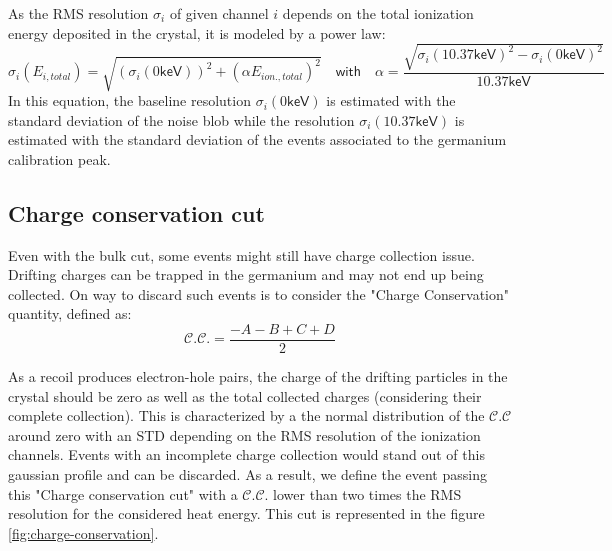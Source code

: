As the RMS resolution $\sigma_i$ of given channel $i$ depends on the total ionization energy deposited in the crystal, it is modeled by a power law:
\begin{equation}
\sigma_i\left( E_{i, total} \right)
=
\sqrt{ 
\left( \sigma_i(0\textsf{keV}) \right)^2 + 
\left( \alpha E_{ion., total} \right)^2
}
\quad \textsf{with} \quad
\alpha = \frac{\sqrt{\sigma_i(10.37\textsf{keV})^2 - \sigma_i(0\textsf{keV})^2}}{10.37 \textsf{keV}}
\end{equation}
In this equation, the baseline resolution $\sigma_i(0\textsf{keV})$ is estimated with the standard deviation of the noise blob while the resolution $\sigma_i(10.37\textsf{keV})$ is estimated with the standard deviation of the events associated to the germanium calibration peak.

\subsection{Charge conservation cut}

Even with the bulk cut, some events might still have charge collection issue. Drifting charges can be trapped in the germanium and may not end up being collected. On way to discard such events is to consider the "Charge Conservation" quantity, defined as:
\begin{equation}
\mathcal{C.C.} = \frac{-A-B+C+D}{2}
\end{equation}

As a recoil produces electron-hole pairs, the charge of the drifting particles in the crystal should be zero as well as the total collected charges (considering their complete collection). This is characterized by a the normal distribution of the $\mathcal{C.C}$ around zero with an STD depending on the RMS resolution of the ionization channels. Events with an incomplete charge collection would stand out of this gaussian profile and can be discarded. As a result, we define the event passing this "Charge conservation cut" with a $\mathcal{C.C.}$ lower than two times the RMS resolution for the considered heat energy. This cut is represented in the figure \ref{fig:charge-conservation}.

